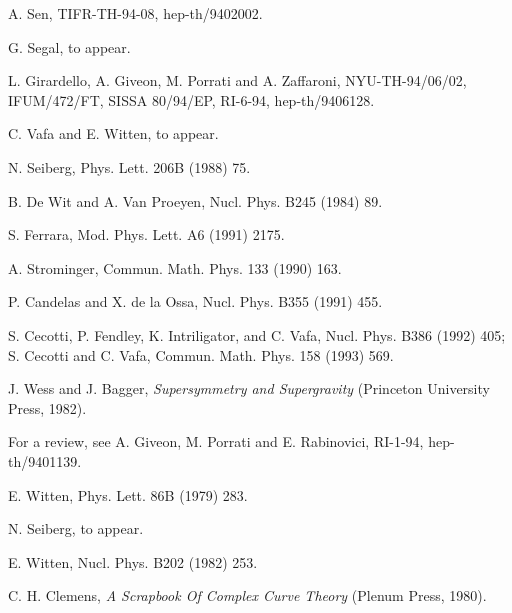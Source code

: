 \documentclass[11pt,a4paper,UTF8,fontset=fandol]{ctexart}
\theoremstyle{plain}
\theoremstyle{definition}
\begin{document}
\begin{enumerate}[label={[\arabic*]}, leftmargin=2.4em, itemsep=1pt, topsep=4pt]
  \item A. Sen, TIFR-TH-94-08, hep-th/9402002.
  \item G. Segal, to appear.
  \item L. Girardello, A. Giveon, M. Porrati and A. Zaffaroni,
        NYU-TH-94/06/02, IFUM/472/FT, SISSA 80/94/EP, RI-6-94, hep-th/9406128.
  \item C. Vafa and E. Witten, to appear.
  \item N. Seiberg, Phys. Lett. 206B (1988) 75.
  \item B. De Wit and A. Van Proeyen, Nucl. Phys. B245 (1984) 89.
  \item S. Ferrara, Mod. Phys. Lett. A6 (1991) 2175.
  \item A. Strominger, Commun. Math. Phys. 133 (1990) 163.
  \item P. Candelas and X. de la Ossa, Nucl. Phys. B355 (1991) 455.
  \item S. Cecotti, P. Fendley, K. Intriligator, and C. Vafa,
        Nucl. Phys. B386 (1992) 405; S. Cecotti and C. Vafa,
        Commun. Math. Phys. 158 (1993) 569.
  \item J. Wess and J. Bagger, \emph{Supersymmetry and Supergravity}
        (Princeton University Press, 1982).
  \item For a review, see A. Giveon, M. Porrati and E. Rabinovici,
        RI-1-94, hep-th/9401139.
  \item E. Witten, Phys. Lett. 86B (1979) 283.
  \item N. Seiberg, to appear.
  \item E. Witten, Nucl. Phys. B202 (1982) 253.
  \item C. H. Clemens, \emph{A Scrapbook Of Complex Curve Theory}
        (Plenum Press, 1980).
\end{enumerate}
\end{document}
